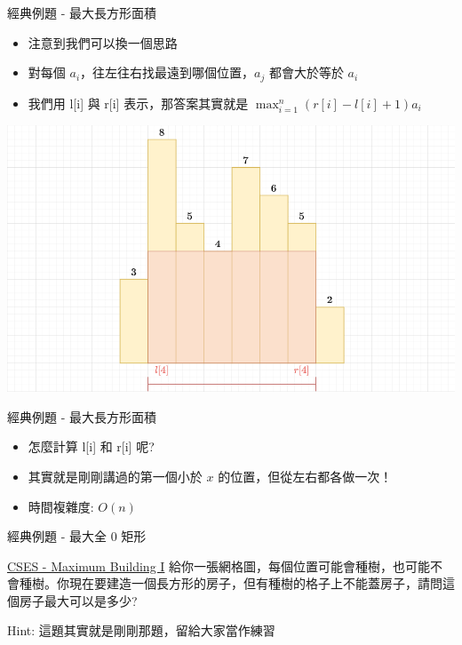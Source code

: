 \documentclass[aspectratio=169]{beamer}
\begin{document}
    \begin{frame}{經典例題 - 最大長方形面積}
        \begin{itemize}
            \item 注意到我們可以換一個思路
            \item 對每個 $a_i$，往左往右找最遠到哪個位置，$a_j$ 都會大於等於 $a_i$
            \item 我們用 l[i] 與 r[i] 表示，那答案其實就是 $\displaystyle \max_{i=1}^n (r[i]-l[i]+1)a_i$
        \end{itemize}
        \begin{center}
            \includegraphics[scale=0.3]{images/CSES_Advertisement_2.png}
        \end{center}
    \end{frame}
    
    \begin{frame}{經典例題 - 最大長方形面積}
        \begin{itemize}
            \item 怎麼計算 l[i] 和 r[i] 呢?
            \item 其實就是剛剛講過的第一個小於 $x$ 的位置，但從左右都各做一次！
            \item 時間複雜度: $O(n)$
        \end{itemize}
    \end{frame}
    
    \begin{frame}{經典例題 - 最大全 0 矩形}
        \begin{block}{\href{https://cses.fi/problemset/task/1147}{CSES - Maximum Building I}}
            給你一張網格圖，每個位置可能會種樹，也可能不會種樹。你現在要建造一個長方形的房子，但有種樹的格子上不能蓋房子，請問這個房子最大可以是多少?
        \end{block}
        Hint: 這題其實就是剛剛那題，留給大家當作練習
    \end{frame}
    
\end{document}
